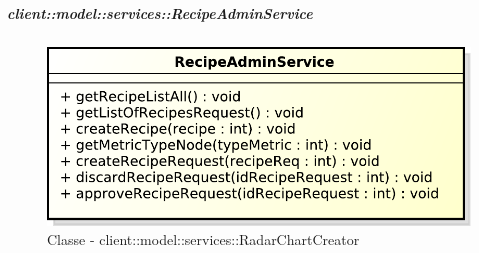 		\subparagraph{client::model::services::RecipeAdminService} %
		\label{subp:client_model_services_recipeadminservice}
		\begin{figure}[htbp]
				\centering
				\centerline{\includegraphics[scale=0.7]{./images/client/classes/model/recipe_admin_service.pdf}}
				\caption{Classe - client::model::services::RadarChartCreator}
			\end{figure}
